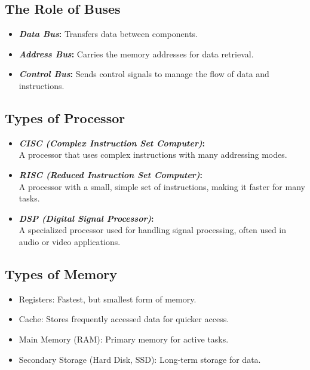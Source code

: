 \subsection{The Role of Buses}
\begin{itemize}[parsep=0.4em]
   \item \textbf{\textit{Data Bus}:} Transfers data between components.
   \item \textbf{\textit{Address Bus}:} Carries the memory addresses for data retrieval.
   \item \textbf{\textit{Control Bus}:} Sends control signals to manage the flow of data and instructions.
\end{itemize}

\subsection{Types of Processor}
\begin{itemize}[parsep=0.4em]
   \item \textbf{\textit{CISC (Complex Instruction Set Computer)}:}\\
   A processor that uses complex instructions with many addressing modes.
   \item \textbf{\textit{RISC (Reduced Instruction Set Computer)}:}\\
   A processor with a small, simple set of instructions, making it faster for many tasks.
   \item \textbf{\textit{DSP (Digital Signal Processor)}:}\\
   A specialized processor used for handling signal processing, often used in audio or video applications.
\end{itemize}

\subsection{Types of Memory}
\begin{itemize}[parsep=0.25em]
   \item Registers: Fastest, but smallest form of memory.
   \item Cache: Stores frequently accessed data for quicker access.
   \item Main Memory (RAM): Primary memory for active tasks.
   \item Secondary Storage (Hard Disk, SSD): Long-term storage for data.
\end{itemize}



